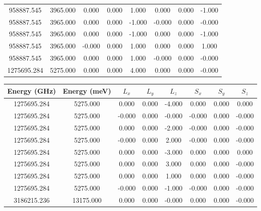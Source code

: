 \documentclass{article}
\begin{document}
\begin{center}
\begin{tabular}{| c | | c | c | c| c | c | c | c |}
958887.545   &    3965.000   &       0.000   &       0.000   &       1.000   &       0.000   &       0.000   &      -1.000  \\
958887.545   &    3965.000   &       0.000   &       0.000   &      -1.000   &      -0.000   &       0.000   &      -0.000  \\
958887.545   &    3965.000   &       0.000   &       0.000   &      -1.000   &       0.000   &       0.000   &      -1.000  \\
958887.545   &    3965.000   &      -0.000   &       0.000   &       1.000   &       0.000   &       0.000   &       1.000  \\
958887.545   &    3965.000   &       0.000   &       0.000   &       1.000   &      -0.000   &       0.000   &      -0.000  \\
1275695.284   &    5275.000   &       0.000   &       0.000   &       4.000   &       0.000   &       0.000   &      -0.000  \\
\hline
\end{tabular}
\end{center}


\begin{center}
\begin{tabular}{| c | | c | c | c| c | c | c | c |}
\hline
Energy (GHz) & Energy (meV)  &  $L_x$ & $L_y$ & $L_z$ & $S_x$ & $S_y$ & $S_z$  \\
\hline
1275695.284   &    5275.000   &       0.000   &       0.000   &      -4.000   &       0.000   &       0.000   &       0.000  \\
1275695.284   &    5275.000   &      -0.000   &       0.000   &      -0.000   &      -0.000   &       0.000   &      -0.000  \\
1275695.284   &    5275.000   &       0.000   &       0.000   &      -2.000   &      -0.000   &       0.000   &      -0.000  \\
1275695.284   &    5275.000   &      -0.000   &       0.000   &       2.000   &      -0.000   &       0.000   &      -0.000  \\
1275695.284   &    5275.000   &       0.000   &       0.000   &      -3.000   &       0.000   &       0.000   &       0.000  \\
1275695.284   &    5275.000   &       0.000   &       0.000   &       3.000   &       0.000   &       0.000   &      -0.000  \\
1275695.284   &    5275.000   &       0.000   &       0.000   &       1.000   &       0.000   &       0.000   &      -0.000  \\
1275695.284   &    5275.000   &      -0.000   &       0.000   &      -1.000   &      -0.000   &       0.000   &      -0.000  \\
3186215.236   &   13175.000   &       0.000   &       0.000   &      -0.000   &       0.000   &       0.000   &      -0.000  \\
\hline
\end{tabular}
\end{center}
\end{document}
